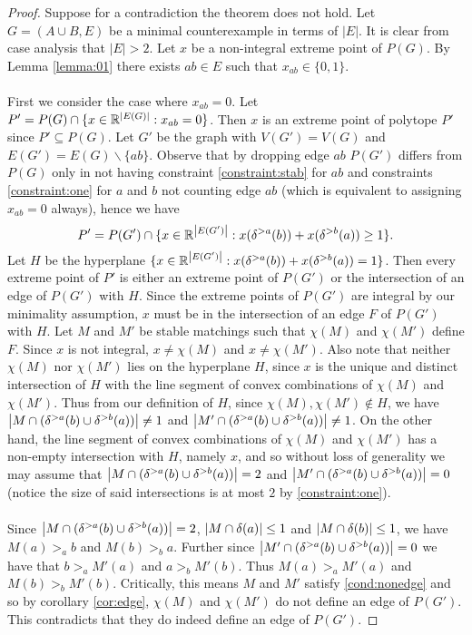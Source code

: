 \begin{proof}
Suppose for a contradiction the theorem does not hold. Let $G=(A\cup B, E)$ be a minimal counterexample in terms of $|E|$. It is clear from case analysis that $|E| > 2$. Let $x$ be a non-integral extreme point of $P(G)$. By Lemma \ref{lemma:01} there exists $ab \in E$ such that $x_{ab} \in \{0,1\}$.
\paragraph{}
First we consider the case where $x_{ab} = 0$. Let $P' = P(G) \cap \{x \in \mathbb{R}^{\left|E(G)\right|} : x_{ab} = 0 \}$. Then $x$ is an extreme point of polytope $P'$ since $P' \subseteq P(G)$. Let $G'$ be the graph with $V(G') = V(G)$ and $E(G') = E(G) \backslash \{ab\}$. Observe that by dropping edge $ab$ $P(G')$ differs from $P(G)$ only in not having constraint \ref{constraint:stab} for $ab$ and constraints \ref{constraint:one} for $a$ and $b$ not counting edge $ab$ (which is equivalent to assigning $x_{ab} = 0$ always), hence we have
$$P' = P(G') \cap \{x \in \mathbb{R}^{\left|E(G')\right|} : x(\delta^{>a}(b)) + x(\delta^{>b}(a)) \geq 1 \}.$$
Let $H$ be the hyperplane $\{x \in \mathbb{R}^{\left|E(G')\right|} : x(\delta^{>a}(b)) + x(\delta^{>b}(a)) = 1\}$. Then every extreme point of $P'$ is either an extreme point of $P(G')$ or the intersection of an edge of $P(G')$ with $H$. Since the extreme points of $P(G')$ are integral by our minimality assumption, $x$ must be in the intersection of an edge $F$ of $P(G')$ with $H$. Let $M$ and $M'$ be stable matchings such that $\chi(M)$ and $\chi(M')$ define $F$. Since $x$ is not integral, $x \neq \chi(M)$ and $x \neq \chi(M')$. Also note that neither $\chi(M)$ nor $\chi(M')$ lies on the hyperplane $H$, since $x$ is the unique and distinct intersection of $H$ with the line segment of convex combinations of $\chi(M)$ and $\chi(M')$. Thus from our definition of $H$, since $\chi(M), \chi(M') \not\in H$,  we have $\left|M \cap (\delta^{>a}(b) \cup \delta^{>b}(a))\right| \neq 1$ and $\left|M' \cap (\delta^{>a}(b) \cup \delta^{>b}(a))\right| \neq 1$. On the other hand, the line segment of convex combinations of $\chi(M)$ and $\chi(M')$ has a non-empty intersection with $H$, namely $x$,  and so without loss of generality we may assume that $\left|M \cap (\delta^{>a}(b) \cup \delta^{>b}(a))\right| = 2$ and $\left|M' \cap (\delta^{>a}(b) \cup \delta^{>b}(a))\right| = 0$ (notice the size of said intersections is at most $2$ by \ref{constraint:one}).
\paragraph{}
Since $\left|M \cap (\delta^{>a}(b) \cup \delta^{>b}(a))\right| = 2$, $\left|M\cap \delta(a)\right| \leq 1$ and $\left|M \cap\delta(b)\right| \leq 1$, we have $M(a) >_a b$ and $M(b) >_b a$. Further since $\left|M' \cap (\delta^{>a}(b) \cup \delta^{>b}(a))\right| = 0$ we have that $b >_a M'(a)$ and $a >_b M'(b)$. Thus $M(a) >_a M'(a)$ and $M(b) >_b M'(b)$. Critically, this means $M$ and $M'$ satisfy \ref{cond:nonedge} and so by corollary \ref{cor:edge}, $\chi(M)$ and $\chi(M')$ do not define an edge of $P(G')$. This contradicts that they do indeed define an edge of $P(G')$.

\end{proof}
